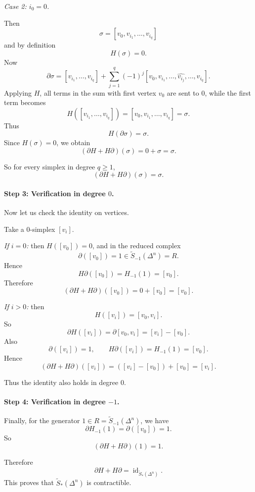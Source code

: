 \documentclass[12pt,a4paper]{article}
\theoremstyle{notespace}
\begin{document}
\medskip

\noindent
\emph{Case 2: \(i_0=0\).}

Then
\[
\sigma=[v_0,v_{i_1},\dots,v_{i_q}]
\]
and by definition
\[
H(\sigma)=0.
\]
Now
\[
\partial \sigma
=
[v_{i_1},\dots,v_{i_q}]
+
\sum_{j=1}^{q}(-1)^j
[v_0,v_{i_1},\dots,\widehat{v_{i_j}},\dots,v_{i_q}].
\]
Applying \(H\), all terms in the sum with first vertex \(v_0\) are sent to \(0\), while the first term becomes
\[
H([v_{i_1},\dots,v_{i_q}])=[v_0,v_{i_1},\dots,v_{i_q}]=\sigma.
\]
Thus
\[
H(\partial \sigma)=\sigma.
\]
Since \(H(\sigma)=0\), we obtain
\[
(\partial H+H\partial)(\sigma)=0+\sigma=\sigma.
\]

So for every simplex in degree \(q\ge 1\),
\[
(\partial H+H\partial)(\sigma)=\sigma.
\]

\paragraph{Step 3: Verification in degree \(0\).}

Now let us check the identity on vertices.

Take a \(0\)-simplex \([v_i]\).

\medskip

\noindent
\emph{If \(i=0\):} then \(H([v_0])=0\), and in the reduced complex
\[
\partial([v_0])=1\in \widetilde{S}_{-1}(\Delta^n)=R.
\]
Hence
\[
H\partial([v_0])=H_{-1}(1)=[v_0].
\]
Therefore
\[
(\partial H+H\partial)([v_0])=0+[v_0]=[v_0].
\]

\medskip

\noindent
\emph{If \(i>0\):} then
\[
H([v_i])=[v_0,v_i].
\]
So
\[
\partial H([v_i])=\partial [v_0,v_i]=[v_i]-[v_0].
\]
Also
\[
\partial([v_i])=1,
\qquad
H\partial([v_i])=H_{-1}(1)=[v_0].
\]
Hence
\[
(\partial H+H\partial)([v_i])
=
([v_i]-[v_0])+[v_0]
=
[v_i].
\]

Thus the identity also holds in degree \(0\).

\paragraph{Step 4: Verification in degree \(-1\).}

Finally, for the generator \(1\in R=\widetilde{S}_{-1}(\Delta^n)\), we have
\[
\partial H_{-1}(1)=\partial([v_0])=1.
\]
So
\[
(\partial H+H\partial)(1)=1.
\]

Therefore
\[
\partial H + H\partial=\operatorname{id}_{\widetilde{S}_*(\Delta^n)}.
\]
This proves that \(\widetilde{S}_*(\Delta^n)\) is contractible.
\end{document}

